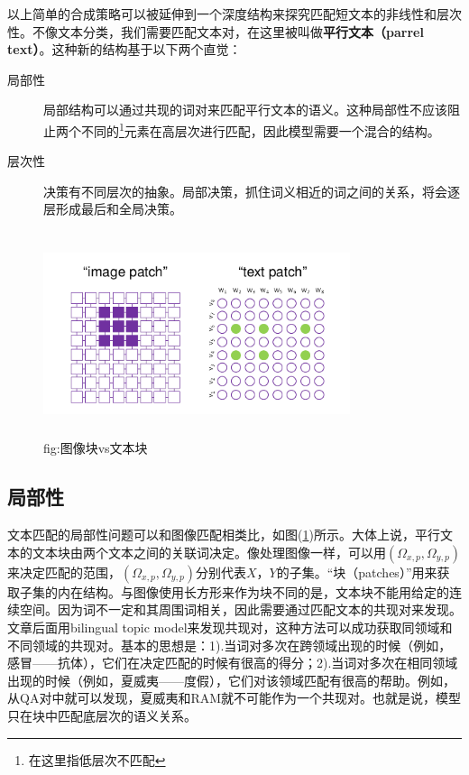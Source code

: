 \documentclass[12pt,a4paper,titlepage]{article}
\begin{document}
以上简单的合成策略可以被延伸到一个深度结构来探究匹配短文本的非线性和层次性。不像文本分类，我们需要匹配文本对，在这里被叫做\textbf{平行文本（parrel text）}。这种新的结构基于以下两个直觉：
\begin{description}
\item[局部性] 局部结构可以通过共现的词对来匹配平行文本的语义。这种局部性不应该阻止两个不同的\footnote{在这里指低层次不匹配}元素在高层次进行匹配，因此模型需要一个混合的结构。
\item[层次性] 决策有不同层次的抽象。局部决策，抓住词义相近的词之间的关系，将会逐层形成最后和全局决策。
\end{description}

\begin{figure}
  \centering
  \includegraphics[height=6cm,width=9cm]{imagetext.png}
  \caption{fig:图像块vs文本块}
  \label{fig:patch}
\end{figure}

\subsection{局部性}

文本匹配的局部性问题可以和图像匹配相类比，如图(\ref{fig:patch})所示。大体上说，平行文本的文本块由两个文本之间的关联词决定。像处理图像一样，可以用$(\Omega_{x,p},\Omega_{y,p})$来决定匹配的范围，$(\Omega_{x,p},\Omega_{y,p})$分别代表$X，Y$的子集。“块（patches）”用来获取子集的内在结构。与图像使用长方形来作为块不同的是，文本块不能用给定的连续空间。因为词不一定和其周围词相关，因此需要通过匹配文本的共现对来发现。文章后面用bilingual topic model来发现共现对，这种方法可以成功获取同领域和不同领域的共现对。基本的思想是：1).当词对多次在跨领域出现的时候（例如，感冒——抗体），它们在决定匹配的时候有很高的得分；2).当词对多次在相同领域出现的时候（例如，夏威夷——度假），它们对该领域匹配有很高的帮助。例如，从QA对中就可以发现，夏威夷和RAM就不可能作为一个共现对。也就是说，模型只在块中匹配底层次的语义关系。
\end{document}
